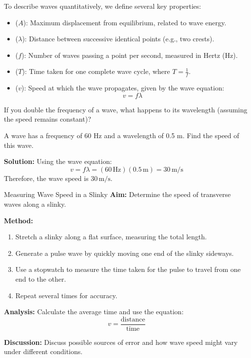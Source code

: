 To describe waves quantitatively, we define several key properties:

\begin{itemize}
\item {} ($A$): Maximum displacement from equilibrium, related to wave energy.
\item {} ($\lambda$): Distance between successive identical points (e.g., two crests).
\item {} ($f$): Number of waves passing a point per second, measured in Hertz (Hz).
\item {} ($T$): Time taken for one complete wave cycle, where \( T = \frac{1}{f} \).
\item {} ($v$): Speed at which the wave propagates, given by the wave equation:
\[
v = f\lambda
\]
\end{itemize}

\begin{stopandthink}
If you double the frequency of a wave, what happens to its wavelength (assuming the speed remains constant)?
\end{stopandthink}

\begin{example}
A wave has a frequency of 60 Hz and a wavelength of 0.5 m. Find the speed of this wave.

\textbf{Solution:}
Using the wave equation:
\[
v = f\lambda = (60\,\text{Hz})(0.5\,\text{m}) = 30\,\text{m/s}
\]
Therefore, the wave speed is \(30\,\text{m/s}\).
\end{example}

\begin{investigation}{Measuring Wave Speed in a Slinky}
\textbf{Aim:} Determine the speed of transverse waves along a slinky.

\textbf{Method:}
\begin{enumerate}
\item Stretch a slinky along a flat surface, measuring the total length.
\item Generate a pulse wave by quickly moving one end of the slinky sideways.
\item Use a stopwatch to measure the time taken for the pulse to travel from one end to the other.
\item Repeat several times for accuracy.
\end{enumerate}

\textbf{Analysis:}
Calculate the average time and use the equation:
\[
v = \frac{\text{distance}}{\text{time}}
\]

\textbf{Discussion:}
Discuss possible sources of error and how wave speed might vary under different conditions.
\end{investigation}

